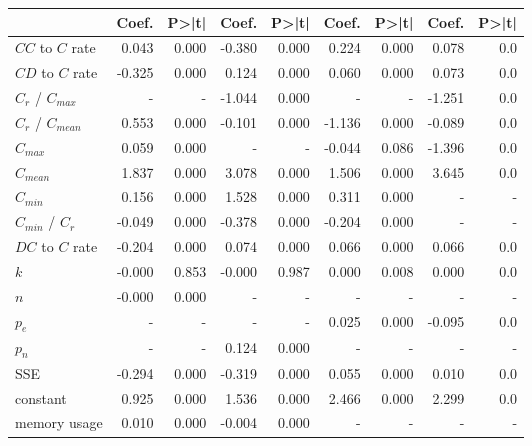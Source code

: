 \begin{tabular}{lrrrrrrrr}
\toprule
{} &  Coef. &  P>|t| &  Coef. &  P>|t| &  Coef. &  P>|t| &  Coef. &  P>|t| \\
\midrule
$CC$ to $C$ rate   &  0.043 &  0.000 & -0.380 &  0.000 &  0.224 &  0.000 &  0.078 &    0.0 \\
$CD$ to $C$ rate   & -0.325 &  0.000 &  0.124 &  0.000 &  0.060 &  0.000 &  0.073 &    0.0 \\
$C_r$ / $C_{max}$  &      - &      - & -1.044 &  0.000 &      - &      - & -1.251 &    0.0 \\
$C_r$ / $C_{mean}$ &  0.553 &  0.000 & -0.101 &  0.000 & -1.136 &  0.000 & -0.089 &    0.0 \\
$C_{max}$          &  0.059 &  0.000 &      - &      - & -0.044 &  0.086 & -1.396 &    0.0 \\
$C_{mean}$         &  1.837 &  0.000 &  3.078 &  0.000 &  1.506 &  0.000 &  3.645 &    0.0 \\
$C_{min}$          &  0.156 &  0.000 &  1.528 &  0.000 &  0.311 &  0.000 &      - &      - \\
$C_{min}$ / $C_r$  & -0.049 &  0.000 & -0.378 &  0.000 & -0.204 &  0.000 &      - &      - \\
$DC$ to $C$ rate   & -0.204 &  0.000 &  0.074 &  0.000 &  0.066 &  0.000 &  0.066 &    0.0 \\
$k$                & -0.000 &  0.853 & -0.000 &  0.987 &  0.000 &  0.008 &  0.000 &    0.0 \\
$n$                & -0.000 &  0.000 &      - &      - &      - &      - &      - &      - \\
$p_e$              &      - &      - &      - &      - &  0.025 &  0.000 & -0.095 &    0.0 \\
$p_n$              &      - &      - &  0.124 &  0.000 &      - &      - &      - &      - \\
SSE                & -0.294 &  0.000 & -0.319 &  0.000 &  0.055 &  0.000 &  0.010 &    0.0 \\
constant           &  0.925 &  0.000 &  1.536 &  0.000 &  2.466 &  0.000 &  2.299 &    0.0 \\
memory usage       &  0.010 &  0.000 & -0.004 &  0.000 &      - &      - &      - &      - \\
\bottomrule
\end{tabular}
